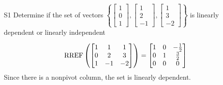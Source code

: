 \documentclass{sbgLAexam}
\begin{document}
\begin{extract}\newpage\end{extract}
\begin{problem}{S1}
Determine if the set of vectors  $\left\{\begin{bmatrix} 1 \\ 0 \\ 1 \end{bmatrix}, \begin{bmatrix} 1 \\ 2 \\ -1 \end{bmatrix}, \begin{bmatrix} 1 \\ 3 \\ -2 \end{bmatrix}\right\}$ is  linearly dependent or linearly independent
\end{problem}
\begin{solution}
$$\operatorname{RREF}\left( \begin{bmatrix} 1 &  1 & 1 \\ 0  & 2 & 3 \\ 1  & -1 & -2 \end{bmatrix} \right) = \begin{bmatrix} 1 &  0 & -\frac{1}{2} \\ 0  & 1 & \frac{3}{2} \\ 0& 0 & 0  \end{bmatrix}$$
Since there is a nonpivot column, the set is linearly dependent.
\end{solution}
\end{document}
